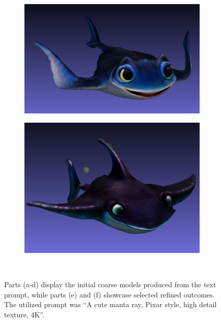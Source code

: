 \begin{figure}[H]
    \begin{subfigure}[b]{0.5\textwidth}
        \centering
        \includegraphics[width=\textwidth]{etc/Genie/manta_refine_2.png}
        \caption{}
    \end{subfigure}
    \begin{subfigure}[b]{0.42\textwidth}
        \centering
        \includegraphics[width=\textwidth]{etc/Genie/manta_refine_4.png}
        \caption{}
    \end{subfigure}
    \caption{Parts (a-d) display the initial coarse models produced from the text prompt, while parts (e) and (f) showcase selected refined outcomes. The utilized prompt was ``A cute manta ray, Pixar style, high detail texture, 4K''.}~\label{fig:GenieAI_manta}

\end{figure}


